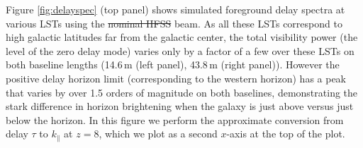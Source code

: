 \documentclass{emulateapj}
\providecommand{\DIFadd}[1]{{\protect\color{blue}\uwave{#1}}} %
\providecommand{\DIFdel}[1]{{\protect\color{red}\sout{#1}}}                      %
\providecommand{\DIFaddbegin}{} %
\providecommand{\DIFaddend}{} %
\providecommand{\DIFdelbegin}{} %
\providecommand{\DIFdelend}{} %
\begin{document}
Figure \ref{fig:delayspec} (top panel) shows simulated foreground delay spectra at various LSTs using the \DIFdelbegin \DIFdel{nominal HFSS }\DIFdelend \DIFaddbegin \DIFadd{full-faceted }\DIFaddend beam. As all these LSTs correspond to high galactic latitudes far from the galactic center, the total visibility power (the level of the zero delay mode) varies only by a factor of a few over these LSTs on both baseline lengths (14.6\,m (left panel), 43.8\,m (right panel)). However the positive delay horizon limit (corresponding to the western horizon) has a peak that varies by over 1.5 orders of magnitude on both baselines, demonstrating the stark difference in horizon brightening when the galaxy is just above versus just below the horizon. In this figure we perform the approximate conversion from delay $\tau$ to $k_\parallel$ at $z=8$, which we plot as a second $x$-axis at the top of the plot. 
\end{document}
